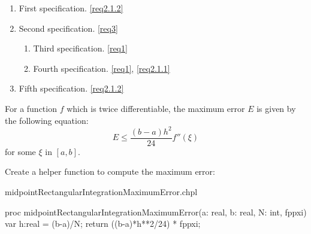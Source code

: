\begin{enumerate}
  \item\label{spec1} First specification. \ref{req2.1.2}
  \item\label{spec2} Second specification. \ref{req3}
  \begin{enumerate}
    \item\label{spec3} Third specification. \ref{req1}
    \item\label{spec4} Fourth specification. \ref{req1}, \ref{req2.1.1}
  \end{enumerate}
  \item\label{spec5} Fifth specification. \ref{req2.1.2}
\end{enumerate}

For a function $f$ which is twice differentiable, the maximum error $E$ is given by
the following equation:
\begin{equation}
E \leq \frac{(b-a)h^2}{24} f''(\xi) \label{eq:rectangle-max-error}
\end{equation}
for some $\xi$ in $[a,b]$.

Create a helper function to compute the maximum error:
\begin{chapelexample}{midpointRectangularIntegrationMaximumError.chpl}
\begin{chapel}
proc midpointRectangularIntegrationMaximumError(a: real, b: real, N: int, fppxi){
  var h:real = (b-a)/N;
  return ((b-a)*h**2/24) * fppxi;
}
\end{chapel}
\end{chapelexample}
